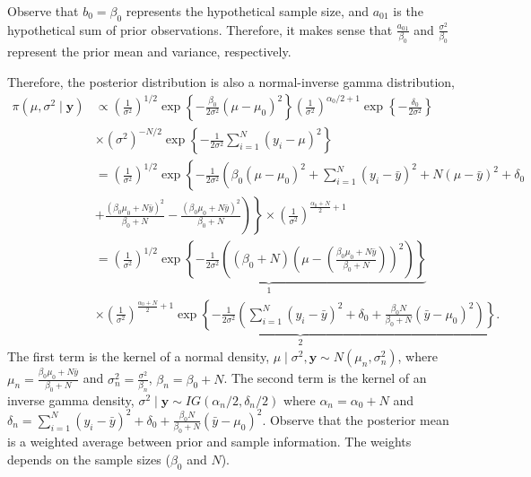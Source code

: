 \begin{enumerate}
Observe that \( b_0 = \beta_0 \) represents the hypothetical sample size, and \( a_{01} \) is the hypothetical sum of prior observations. Therefore, it makes sense that \( \frac{a_{01}}{\beta_0} \) and \( \frac{\sigma^2}{\beta_0} \) represent the prior mean and variance, respectively.

Therefore, the posterior distribution is also a normal-inverse gamma distribution,
{\footnotesize{
\begin{align}
	\pi(\mu,\sigma^2\mid \bm{y})&\propto \left(\frac{1}{\sigma^2}\right)^{1/2}\exp\left\{-\frac{\beta_0}{2\sigma^2}(\mu-\mu_0)^2\right\}\left(\frac{1}{\sigma^2}\right)^{\alpha_0/2+1}\exp\left\{-\frac{\delta_0}{2\sigma^2}\right\}\nonumber\\
	&\times(\sigma^2)^{-N/2}\exp\left\{-\frac{1}{2\sigma^2}\sum_{i=1}^N (y_i-\mu)^2\right\}\nonumber\\
	& = \left(\frac{1}{\sigma^2}\right)^{1/2}\exp\left\{-\frac{1}{2\sigma^2}\left(\beta_0(\mu-\mu_0)^2+\sum_{i=1}^N (y_i-\bar{y})^2+N(\mu-\bar{y})^2+\delta_0\right.\right.\nonumber\\
	& \left.\left.+ \frac{(\beta_0\mu_0+N\bar{y})^2}{\beta_0+N} - \frac{(\beta_0\mu_0+N\bar{y})^2}{\beta_0+N}\right)\right\}\times\left(\frac{1}{\sigma^2}\right)^{\frac{\alpha_0+N}{2}+1}\nonumber\\
	& = \underbrace{\left(\frac{1}{\sigma^2}\right)^{1/2}\exp\left\{-\frac{1}{2\sigma^2}\left((\beta_0+N)\left(\mu-\left(\frac{\beta_0\mu_0+N\bar{y}}{\beta_0+N}\right)\right)^2\right)\right\}}_{1}\nonumber\\
	& \times \underbrace{\left(\frac{1}{\sigma^2}\right)^{\frac{\alpha_0+N}{2}+1}\exp\left\{-\frac{1}{2\sigma^2}\left(\sum_{i=1}^N (y_i-\bar{y})^2+\delta_0+\frac{\beta_0N}{\beta_0+N}(\bar{y}-\mu_0)^2\right)\right\}}_{2}.\nonumber
\end{align}
}}
The first term is the kernel of a normal density, $\mu\mid \sigma^2,\bm{y}\sim N \left(\mu_n, \sigma_n^2\right)$, where $\mu_n=\frac{\beta_0\mu_0+N\bar{y}}{\beta_0+N}$ and $\sigma_n^2=\frac{\sigma^2}{\beta_n}$, $\beta_n=\beta_0+N$. The second term is the kernel of an inverse gamma density, $\sigma^2\mid \bm{y}\sim IG(\alpha_n/2,\delta_n/2)$ where $\alpha_n=\alpha_0+N$ and $\delta_n=\sum_{i=1}^N (y_i-\bar{y})^2+\delta_0+\frac{\beta_0N}{\beta_0+N}(\bar{y}-\mu_0)^2$. Observe that the posterior mean is a weighted average between prior and sample information. The weights depends on the sample sizes ($\beta_0$ and $N$).


\end{enumerate}
